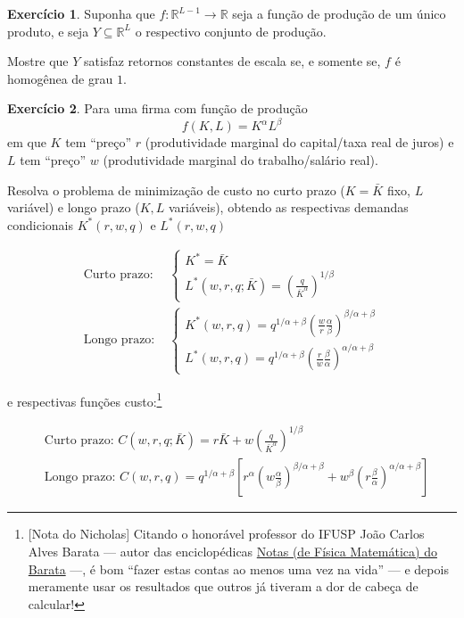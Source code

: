 \documentclass[12pt]{article}
\numberwithin{equation}{section}
\theoremstyle{plain}
\theoremstyle{definition}
\newtheorem{exercise}{Exercício}
\theoremstyle{remark}
\begin{document}
\begin{exercise}
Suponha que \(f: \mathbb{R}^{L-1} \to \mathbb{R}\) seja a função de
produção de um único produto, e seja \(Y \subseteq \mathbb{R}^L\) o
respectivo conjunto de produção.

Mostre que \(Y\) satisfaz retornos constantes de escala se, e somente
se, \(f\) é homogênea de grau \(1\).
\end{exercise}

\begin{exercise}
Para uma firma com função de produção
\[
f(K, L) = K^{\alpha}L^{\beta}
\]
em que \(K\) tem ``preço'' \(r\) (produtividade marginal do capital/taxa
real de juros) e \(L\) tem ``preço'' \(w\) (produtividade marginal do
trabalho/salário real).

Resolva o problema de minimização de custo no curto prazo (\(K=\bar{K}\)
fixo, \(L\) variável) e longo prazo (\(K,L\) variáveis), obtendo as
respectivas demandas condicionais \(K^{*}(r,w,q)\) e \(L^{*}(r,w,q)\)

\begin{align*}
\text{Curto prazo: }&  \begin{cases}
K^{*} = \bar{K} \\
L^{*}(w,r,q;\bar{K}) = \left( \frac{q}{\bar{K}^{\alpha}} \right)^{1/\beta}
\end{cases} \\
\text{Longo prazo: }& \begin{cases}
K^{*}(w,r,q) = q^{1/\alpha+\beta} \left( \frac{w}{r} \frac{\alpha}{\beta} \right)^{\beta/\alpha+\beta} \\
L^{*}(w,r,q) = q^{1/\alpha+\beta} \left( \frac{r}{w} \frac{\beta}{\alpha} \right)^{\alpha/\alpha+\beta}
\end{cases}
\end{align*}

e respectivas funções custo:\footnote{[Nota do Nicholas] Citando o honorável
  professor do IFUSP João Carlos Alves Barata --- autor das
  enciclopédicas
  \href{https://denebola.if.usp.br/~jbarata/Notas_de_aula/capitulos.html}{Notas
  (de Física Matemática) do Barata} ---, é bom ``fazer estas contas ao
  menos uma vez na vida'' --- e depois meramente usar os resultados que
  outros já tiveram a dor de cabeça de calcular!}

\begin{align*}
&\text{Curto prazo: } C(w,r,q; \bar{K}) = r \bar{K} + w \left( \frac{q}{\bar{K}^{\alpha}}\right)^{1/\beta} \\
&\text{Longo prazo: } C(w, r, q) = q^{1/\alpha+\beta}  \left[ r^{\alpha} \left(w \frac{\alpha}{\beta} \right)^{\beta/\alpha+\beta}
+ w^{\beta} \left( r \frac{\beta}{\alpha} \right)^{\alpha/\alpha+\beta} \right]
\end{align*}
\end{exercise}
\end{document}
